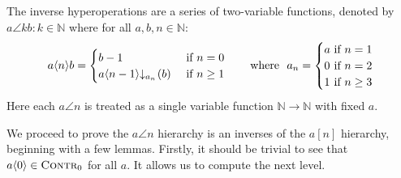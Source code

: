 \begin{defn} \label{defn: inv-hyperop}
	The inverse hyperoperations are a series of two-variable functions, denoted by $a\angle{k}b : k\in \mathbb{N}$ where for all $a, b, n\in \mathbb{N}$:
	\begin{equation}
	a\angle{n}b = \begin{cases}
	b - 1 & \hspace{-10pt} \quad \text{ if } n = 0 \\
	\cdt{a\angle{n-1}}{a_n}(b) & \hspace{-10pt} \quad \text{ if } n \ge 1
	\end{cases}
	\ \ \quad \text{ where } \ a_n = \begin{cases}
	a & \hspace{-10pt}\text{ if } n = 1 \\
	0 & \hspace{-10pt}\text{ if } n = 2 \\
	1 & \hspace{-10pt}\text{ if } n \ge 3
	\end{cases}
	\end{equation}
	Here each $a\angle{n}$ is treated as a single variable function $\mathbb{N}\to \mathbb{N}$ with fixed $a$.
\end{defn}
We proceed to prove the $a\angle{n}$ hierarchy is an inverses of the $a[n]$ hierarchy, beginning with a few lemmas. Firstly, it should be trivial to see that $a\langle 0\rangle\in \text{\scshape{Contr}}_0$ for all $a$. It allows us to compute the next level.

